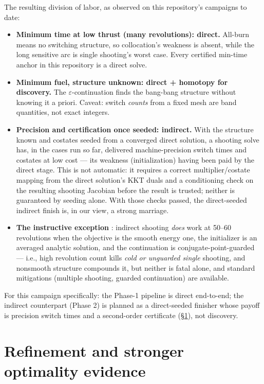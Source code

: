 \documentclass[11pt]{article}
\begin{document}
The resulting division of labor, as observed on this repository's
campaigns to date:
\begin{itemize}
\item \textbf{Minimum time at low thrust (many revolutions): direct.}
  All-burn means no switching structure, so collocation's weakness is
  absent, while the long sensitive arc is single shooting's worst case.
  Every certified min-time anchor in this repository is a direct solve.
\item \textbf{Minimum fuel, structure unknown: direct + homotopy for
  discovery.} The $\varepsilon$-continuation finds the bang-bang structure
  without knowing it a priori. Caveat: switch \emph{counts} from a fixed
  mesh are band quantities, not exact integers.
\item \textbf{Precision and certification once seeded: indirect.} With the
  structure known and costates seeded from a converged direct solution, a
  shooting solve has, in the cases run so far, delivered machine-precision
  switch times and costates at low cost --- its weakness (initialization)
  having been paid by the direct stage. This is not automatic: it requires
  a correct multiplier/costate mapping from the direct solution's KKT
  duals and a conditioning check on the resulting shooting Jacobian before
  the result is trusted; neither is guaranteed by seeding alone. With those
  checks passed, the direct-seeded indirect finish is, in our view, a
  strong marriage.
\item \textbf{The instructive exception} \cite{BCP2010}: indirect shooting
  \emph{does} work at 50--60 revolutions when the objective is the smooth
  energy one, the initializer is an averaged analytic solution, and the
  continuation is conjugate-point-guarded --- i.e., high revolution count
  kills \emph{cold or unguarded single} shooting, and nonsmooth structure
  compounds it, but neither is fatal alone, and standard mitigations
  (multiple shooting, guarded continuation) are available.
\end{itemize}
For this campaign specifically: the Phase-1 pipeline is direct end-to-end;
the indirect counterpart (Phase 2) is planned as a direct-seeded finisher
whose payoff is precision switch times and a second-order certificate
(\S\ref{sec:minimality}), not discovery.

\section{Refinement and stronger optimality evidence}
\label{sec:minimality}
\end{document}
